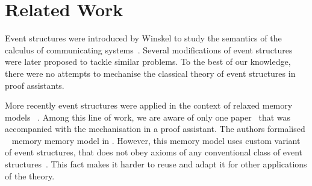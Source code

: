 \section{Related Work}


Event structures were introduced by Winskel to study the semantics of 
the calculus of communicating systems~\cite{Winskel:82}. 
Several modifications of event structures~\cite{Langerak:91, Boudol-Castellani:1991}
were later proposed to tackle similar problems.  
To the best of our knowledge, there were no attempts 
to mechanise the classical theory of event structures 
in proof assistants. 
 
More recently event structures were applied 
in the context of relaxed memory models~%
\cite{Jeffrey-Riely:LICS16, PichonPharabod-Sewell:POPL16, Chakraborty-Vafeiadis:POPL19, Moiseenko-al:ECOOP20}.
Among this line of work, we are aware of only one paper~\cite{Moiseenko-al:ECOOP20}
that was accompanied with the mechanisation in a proof assistant. 
The authors formalised \weakestmo~\cite{Chakraborty-Vafeiadis:POPL19} 
memory memory model in \coq. However, this memory model uses 
custom variant of event structures, that does not 
obey axioms of any conventional class of 
event structures~\cite{Winskel:82, Langerak:91, Boudol-Castellani:1991}. 
This fact makes it harder to reuse and adapt it 
for other applications of the theory. 

